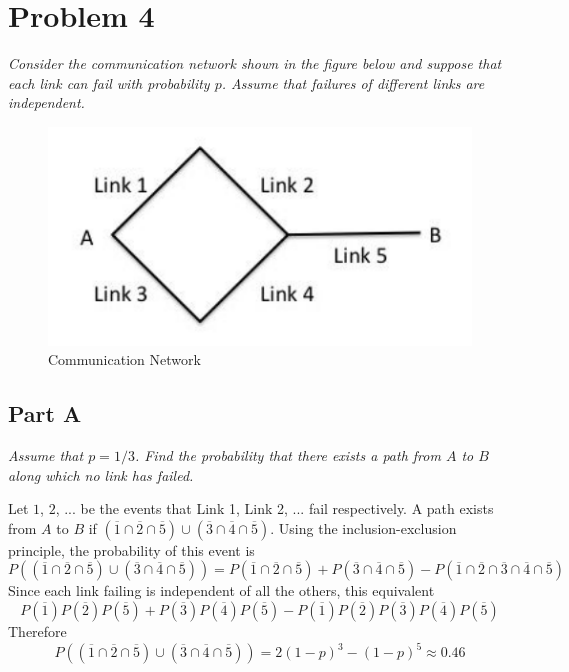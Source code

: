 \documentclass{article}
\begin{document}
\section*{Problem 4}

\textit{Consider the communication network shown in the figure below and suppose
that each link can fail with probability $ p $. Assume that failures of
different links are independent.}

\begin{figure}[H]
    \centering
    \includegraphics[scale=1]{"P4"}
    \caption{ Communication Network }
\end{figure}

\subsection*{Part A}

\textit{Assume that $ p = 1/3 $. Find the probability that there exists a path
from $ A $ to $ B $ along which no link has failed.}

\bigbreak

Let $ 1 $, $ 2 $, ... be the events that Link 1, Link 2, ... fail respectively.
A path exists from $ A $ to $ B $ if $ (\overline{1} \cap \overline{2} \cap
\overline{5}) \cup (\overline{3} \cap \overline{4} \cap \overline{5}) $. Using
the inclusion-exclusion principle, the probability of this event is
$$ P((\overline{1} \cap \overline{2} \cap \overline{5}) \cup (\overline{3} \cap
\overline{4} \cap \overline{5})) = P(\overline{1} \cap \overline{2} \cap
\overline{5}) + P(\overline{3} \cap \overline{4} \cap \overline{5}) -
P(\overline{1} \cap \overline{2} \cap \overline{3} \cap \overline{4} \cap
\overline{5}) $$
Since each link failing is independent of all the others, this equivalent
$$ P(\overline{1})P(\overline{2})P(\overline{5}) +
P(\overline{3})P(\overline{4})P(\overline{5}) -
P(\overline{1})P(\overline{2})P(\overline{3})P(\overline{4})P(\overline{5}) $$
Therefore
$$ P((\overline{1} \cap \overline{2} \cap \overline{5}) \cup (\overline{3} \cap
\overline{4} \cap \overline{5})) = 2(1 - p)^3 - (1 - p)^5 \approx 0.46 $$
\end{document}
